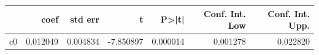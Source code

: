 \begin{tabular}{lrrrrrr}
\toprule
 & coef & std err & t & P>|t| & Conf. Int. Low & Conf. Int. Upp. \\
\midrule
c0 & 0.012049 & 0.004834 & -7.850897 & 0.000014 & 0.001278 & 0.022820 \\
\bottomrule
\end{tabular}